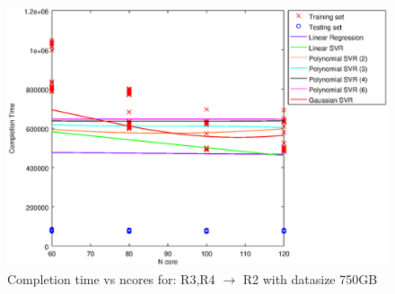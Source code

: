 
\begin {figure}[hbtp]
\centering
\includegraphics[width=\textwidth]{output/R3_R4_VS_R2_750_ALL_FEATURES/plot_R3_R4_VS_R2_750.eps}
\caption{Completion time vs ncores for: R3,R4 $\rightarrow$ R2 with datasize 750GB}
\label{fig:coreonly_linear_R3,R4_R2_750}
\end {figure}
